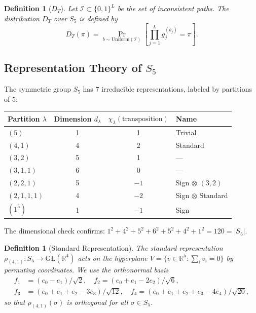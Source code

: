 \documentclass[11pt]{article}
\newtheorem{definition}[theorem]{Definition}
\begin{document}
\begin{definition}[$D_T$]
Let $\mathcal{I} \subset \{0,1\}^L$ be the set of inconsistent paths.
The distribution $D_T$ over $S_5$ is defined by
\[
D_T(\pi) = \Pr_{b \sim \mathrm{Uniform}(\mathcal{I})}
\left[ \prod_{j=1}^{L} g_j^{(b_j)} = \pi \right].
\]
\end{definition}


\subsection{Representation Theory of $S_5$}

The symmetric group $S_5$ has $7$ irreducible representations, labeled by
partitions of $5$:

\begin{center}
\begin{tabular}{lccl}
\toprule
Partition $\lambda$ & Dimension $d_\lambda$ & $\chi_\lambda(\text{transposition})$ & Name \\
\midrule
$(5)$       & 1 & 1 & Trivial \\
$(4,1)$     & 4 & 2 & Standard \\
$(3,2)$     & 5 & 1 & --- \\
$(3,1,1)$   & 6 & 0 & --- \\
$(2,2,1)$   & 5 & $-1$ & Sign $\otimes$ $(3,2)$ \\
$(2,1,1,1)$ & 4 & $-2$ & Sign $\otimes$ Standard \\
$(1^5)$     & 1 & $-1$ & Sign \\
\bottomrule
\end{tabular}
\end{center}

The dimensional check confirms: $1^2 + 4^2 + 5^2 + 6^2 + 5^2 + 4^2 + 1^2 = 120 = |S_5|$.

\begin{definition}[Standard Representation]
The standard representation $\rho_{(4,1)} : S_5 \to \mathrm{GL}(\mathbb{R}^4)$
acts on the hyperplane $V = \{v \in \mathbb{R}^5 : \sum_i v_i = 0\}$ by
permuting coordinates. We use the orthonormal basis
\begin{align*}
f_1 &= (e_0 - e_1)/\sqrt{2}, \quad
f_2 = (e_0 + e_1 - 2e_2)/\sqrt{6}, \\
f_3 &= (e_0 + e_1 + e_2 - 3e_3)/\sqrt{12}, \quad
f_4 = (e_0 + e_1 + e_2 + e_3 - 4e_4)/\sqrt{20},
\end{align*}
so that $\rho_{(4,1)}(\sigma)$ is orthogonal for all $\sigma \in S_5$.
\end{definition}
\end{document}
